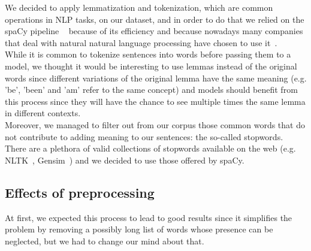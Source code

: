 We decided to apply lemmatization and tokenization, which are common operations in NLP tasks, on our dataset, and in order to do that we relied on the spaCy pipeline ~\cite{startups:spaCy} because of its efficiency and because nowadays many companies that deal with natural natural language processing have chosen to use it~\cite{data:companies_using_spacy}.\\

While it is common to tokenize sentences into words before passing them to a model, we thought it would be interesting to use lemmas instead of the original words since different variations of the original lemma have the same meaning (e.g. 'be', 'been' and 'am' refer to the same concept) and models should benefit from this process since they will have the chance to see multiple times the same lemma in different contexts. \\

Moreover, we managed to filter out from our corpus those common words that do not contribute to adding meaning to our sentences: the so-called stopwords. There are a plethora of valid collections of stopwords available on the web (e.g. NLTK~\cite{startups:nltk}, Gensim~\cite{startups:gensim}) and we decided to use those offered by spaCy. %


\subsection*{Effects of preprocessing}

At first, we expected this process to lead to good results since it simplifies the problem by removing a possibly long list of words whose presence can be neglected, but we had to change our mind about that.\\

